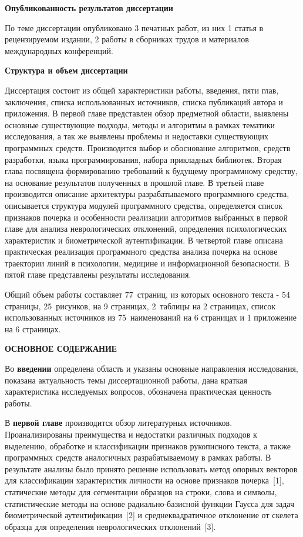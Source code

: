 \bigskip
\textbf{Опубликованность результатов диссертации}
\bigskip

По теме диссертации опубликовано 3 печатных работ, из них 1 статья в рецензируемом издании, 2 работы в сборниках трудов и материалов международных конференций.

\bigskip
\textbf{Структура и объем диссертации}
\bigskip

Диссертация состоит из общей характеристики работы, введения, пяти глав, заключения, списка использованных источников, списка публикаций автора и приложения. В первой главе представлен обзор предметной области, выявлены основные существующие подходы, методы и алгоритмы в рамках тематики исследования, а так же выявлены проблемы и недоставки существующих программных средств. Производится выбор и обоснование алгоритмов, средств разработки, языка программирования, набора прикладных библиотек. Вторая глава посвящена формированию требований к будущему программному средству, на основание результатов полученных в прошлой главе. В третьей главе производится описание архитектуры разрабатываемого программного средства, описывается структура модулей программного средства, определяется список признаков почерка и особенности реализации алгоритмов выбранных в первой главе для анализа неврологических отклонений, определения психологических характеристик и биометрической аутентификации. В четвертой главе описана практическая реализация программного средства анализа почерка на основе траектории линий в психологии, медицине и информационной безопасности. В пятой главе представлены результаты исследования.

Общий объем работы составляет 77~страниц, из которых основного текста - 54 страницы, 25~рисунков, на 9 страницах, 2~таблицы на 2 страницах, список использованных источников из 75~наименований на 6 страницах и 1 приложение на 6 страницах.

\begin{center}
{\bfseries ОСНОВНОЕ СОДЕРЖАНИЕ}
\end{center}

Во \textbf{введении} определена область и указаны основные направления исследования, показана актуальность темы диссертационной работы, дана краткая характеристика исследуемых вопросов, обозначена практическая ценность работы.

В \textbf{первой главе} производится обзор литературных источников. Проанализированы преимущества и недостатки различных подходов к выделению, обработке и классификации признаков рукописного текста, а также программных средств аналогичных разрабатываемому в рамках работы. В результате анализы было принято решение использовать метод опорных векторов для классификации характеристик личности на основе признаков почерка~[1], статические методы для сегментации образцов на строки, слова и символы, статистические методы на основе радиально-базисной функции Гаусса для задач биометрической аутентификации~[2] и среднеквадратичное отклонение от скелета образца для определения неврологических отклонений~[3].


